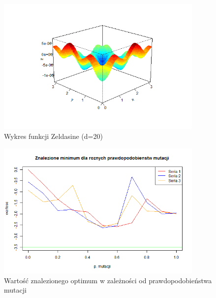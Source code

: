 \documentclass[11pt, a4paper]{article}
\begin{document}
\begin{figure}[H]
	\begin{center}
		\includegraphics[width=0.9\textwidth]{./assets/Zeldasine201.png} %
		\caption{Wykres funkcji Zeldasine (d=20)}
		\label{fig:zeldasine1}
	\end{center}
\end{figure}

\begin{figure}[H]
	\begin{center}
		\includegraphics[width=0.9\textwidth]{./assets/Zeldasine202.png} %
		\caption{Wartość znalezionego optimum w zależności od prawdopodobieństwa mutacji}
		\label{fig:zeldasine2}
	\end{center}
\end{figure}
\end{document}

